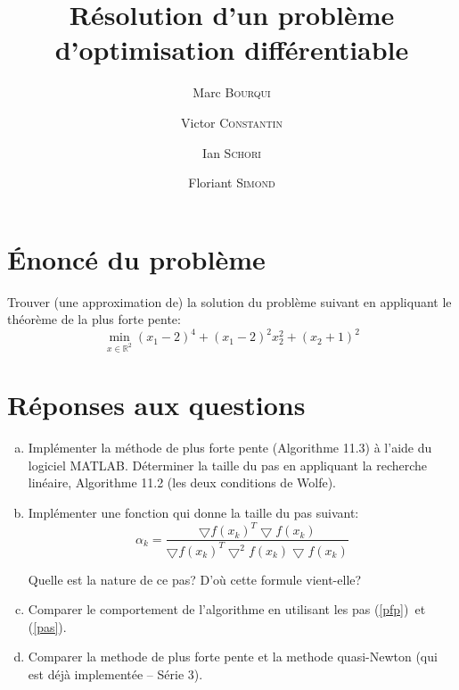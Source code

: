 \documentclass[11pt,a4paper,twoside,onecolumn,titlepage]{report}
\title{Résolution d'un problème d'optimisation différentiable}
\author{Marc \textsc{Bourqui} \and Victor \textsc{Constantin} \and Ian \textsc{Schori} \and Floriant \textsc{Simond}}
\begin{document}
\maketitle

\section*{Énoncé du problème}

Trouver (une approximation de) la solution du problème suivant en appliquant le théorème de la plus forte pente:
\begin{equation}
\min_{x\in\mathbb{R}^2} (x_1-2)^4 + (x_1-2)^2x_2^2 + (x_2+1)^2
\end{equation}

\section*{Réponses aux questions}

\begin{enumerate}[(a)]
\item\label{pfp} Implémenter la méthode de plus forte pente (Algorithme 11.3) à l'aide du logiciel MATLAB. Déterminer la taille du pas en appliquant la recherche linéaire, Algorithme 11.2 (les deux conditions de Wolfe).

%
%






\item\label{pas} Implémenter une fonction qui donne la taille du pas suivant:
\begin{equation}
\alpha_k = \frac{\bigtriangledown f(x_k)^T \bigtriangledown f(x_k)}{\bigtriangledown f(x_k)^T \bigtriangledown^2 f(x_k) \bigtriangledown f(x_k)}
\end{equation}

Quelle est la nature de ce pas? D'où cette formule vient-elle?

%
%

\item Comparer le comportement de l'algorithme en utilisant les pas (\ref{pfp})\ et (\ref{pas}).

%
%

\item Comparer la methode de plus forte pente et la methode quasi-Newton (qui est déjà implementée -- Série 3).

%
%

\end{enumerate}
\end{document}
